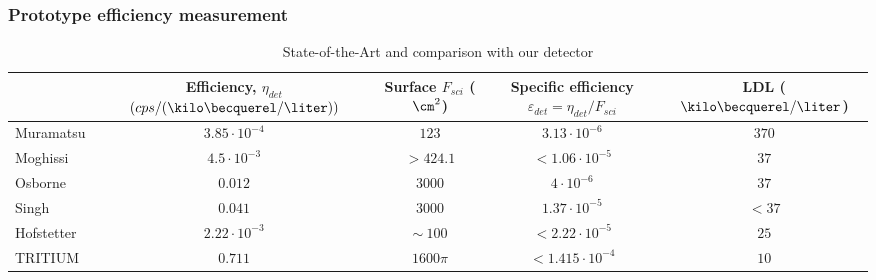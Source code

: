 \documentclass{beamer}
\begin{document}
\begin{frame}
\frametitle{Prototype efficiency measurement}

\begin{table}[htbp]
\begin{center}
\begin{tabular}{l|c|c|c|c}
\hline
 & \parbox{6em}{\centering Efficiency, $\eta_{det}$\\ $(cps/(\kilo\becquerel/\liter))$}  & \parbox{5em}{\centering Surface\\ $F_{sci}$ ($\cm^2$)}  & \parbox{5em}{\centering Specific efficiency\\ $\varepsilon_{det}=\eta_{det}/F_{sci}$} & LDL ($\kilo\becquerel/\liter$)\\
\hline \hline \hline
Muramatsu & $3.85 \cdot 10^{-4}$ & $123$ & $3.13 \cdot 10^{-6}$ & $370$ \\ \hline
Moghissi & $4.5 \cdot 10^{-3}$ & $>424.1$ & $<1.06 \cdot 10^{-5}$ & $37$ \\ \hline
Osborne & $0.012$ & $3000$ & $4 \cdot 10^{-6}$ & $37$ \\ \hline
Singh & $0.041$ & $3000$ & $1.37 \cdot 10^{-5}$ & $<37$ \\ \hline
Hofstetter & $2.22 \cdot 10^{-3}$ & $\sim~100$ & $<2.22 \cdot 10^{-5}$ & $25$ \\ \hline
TRITIUM & $0.711$ & $1600\pi$ & $<1.415 \cdot 10^{-4}$ & $10$ \\ \hline
\end{tabular}

\caption{State-of-the-Art and comparison with our detector}
\end{center}
\end{table}

\end{frame}
\end{document}
